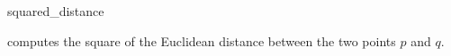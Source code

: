 \begin{ccRefFunction}{squared_distance}

{computes the square of the Euclidean distance between the two points
  $p$ and $q$. }

\end{ccRefFunction}
